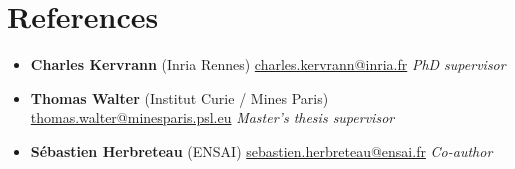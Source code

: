 \documentclass[10pt,a4paper]{article}
\begin{document}
\section{References}

\begin{itemize}[label={}, leftmargin=0pt]
  \item \textbf{Charles Kervrann} {\small (Inria Rennes)} \quad \href{mailto:charles.kervrann@inria.fr}{charles.kervrann@inria.fr} \hfill \textit{PhD supervisor}
  \item \textbf{Thomas Walter} {\small (Institut Curie / Mines Paris)} \quad \href{mailto:thomas.walter@minesparis.psl.eu}{thomas.walter@minesparis.psl.eu} \hfill \textit{Master's thesis supervisor}
  \item \textbf{S\'ebastien Herbreteau} {\small (ENSAI)} \quad \href{mailto:sebastien.herbreteau@ensai.fr}{sebastien.herbreteau@ensai.fr} \hfill \textit{Co-author}
\end{itemize}
\end{document}
